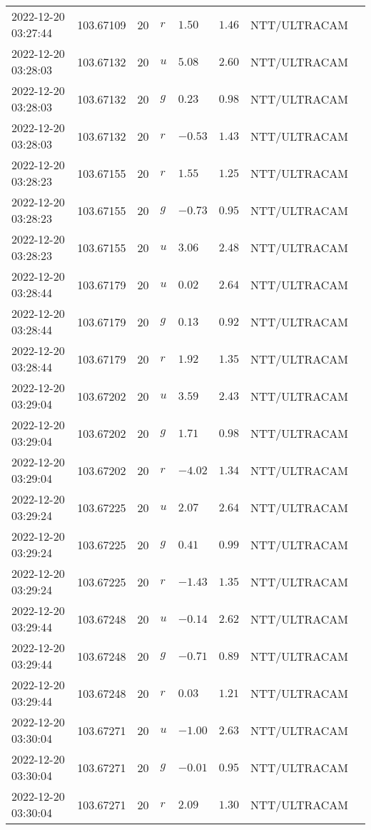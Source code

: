 \documentclass{nature_plusfigure}
\begin{document}
\begin{supplement}
\begin{center}
\begin{longtable}{llllllll}
2022-12-20 03:27:44 & 103.67109 & 20 & $r$ & $1.50$ & $1.46$ & NTT/ULTRACAM &  \\ 
2022-12-20 03:28:03 & 103.67132 & 20 & $u$ & $5.08$ & $2.60$ & NTT/ULTRACAM &  \\ 
2022-12-20 03:28:03 & 103.67132 & 20 & $g$ & $0.23$ & $0.98$ & NTT/ULTRACAM &  \\ 
2022-12-20 03:28:03 & 103.67132 & 20 & $r$ & $-0.53$ & $1.43$ & NTT/ULTRACAM &  \\ 
2022-12-20 03:28:23 & 103.67155 & 20 & $r$ & $1.55$ & $1.25$ & NTT/ULTRACAM &  \\ 
2022-12-20 03:28:23 & 103.67155 & 20 & $g$ & $-0.73$ & $0.95$ & NTT/ULTRACAM &  \\ 
2022-12-20 03:28:23 & 103.67155 & 20 & $u$ & $3.06$ & $2.48$ & NTT/ULTRACAM &  \\ 
2022-12-20 03:28:44 & 103.67179 & 20 & $u$ & $0.02$ & $2.64$ & NTT/ULTRACAM &  \\ 
2022-12-20 03:28:44 & 103.67179 & 20 & $g$ & $0.13$ & $0.92$ & NTT/ULTRACAM &  \\ 
2022-12-20 03:28:44 & 103.67179 & 20 & $r$ & $1.92$ & $1.35$ & NTT/ULTRACAM &  \\ 
2022-12-20 03:29:04 & 103.67202 & 20 & $u$ & $3.59$ & $2.43$ & NTT/ULTRACAM &  \\ 
2022-12-20 03:29:04 & 103.67202 & 20 & $g$ & $1.71$ & $0.98$ & NTT/ULTRACAM &  \\ 
2022-12-20 03:29:04 & 103.67202 & 20 & $r$ & $-4.02$ & $1.34$ & NTT/ULTRACAM &  \\ 
2022-12-20 03:29:24 & 103.67225 & 20 & $u$ & $2.07$ & $2.64$ & NTT/ULTRACAM &  \\ 
2022-12-20 03:29:24 & 103.67225 & 20 & $g$ & $0.41$ & $0.99$ & NTT/ULTRACAM &  \\ 
2022-12-20 03:29:24 & 103.67225 & 20 & $r$ & $-1.43$ & $1.35$ & NTT/ULTRACAM &  \\ 
2022-12-20 03:29:44 & 103.67248 & 20 & $u$ & $-0.14$ & $2.62$ & NTT/ULTRACAM &  \\ 
2022-12-20 03:29:44 & 103.67248 & 20 & $g$ & $-0.71$ & $0.89$ & NTT/ULTRACAM &  \\ 
2022-12-20 03:29:44 & 103.67248 & 20 & $r$ & $0.03$ & $1.21$ & NTT/ULTRACAM &  \\ 
2022-12-20 03:30:04 & 103.67271 & 20 & $u$ & $-1.00$ & $2.63$ & NTT/ULTRACAM &  \\ 
2022-12-20 03:30:04 & 103.67271 & 20 & $g$ & $-0.01$ & $0.95$ & NTT/ULTRACAM &  \\ 
2022-12-20 03:30:04 & 103.67271 & 20 & $r$ & $2.09$ & $1.30$ & NTT/ULTRACAM &  \\ 

\end{longtable}
\end{center}
\end{supplement}
\end{document}
